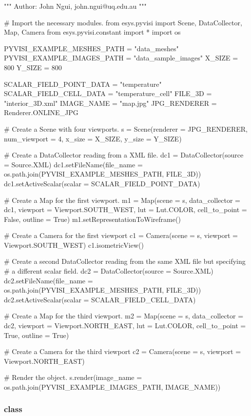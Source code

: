 \begin{python}
"""
Author: John Ngui, john.ngui@uq.edu.au
"""

# Import the necessary modules.
from esys.pyvisi import Scene, DataCollector, Map, Camera
from esys.pyvisi.constant import *
import os

PYVISI_EXAMPLE_MESHES_PATH = "data_meshes"
PYVISI_EXAMPLE_IMAGES_PATH = "data_sample_images"
X_SIZE = 800
Y_SIZE = 800

SCALAR_FIELD_POINT_DATA = "temperature"
SCALAR_FIELD_CELL_DATA = "temperature_cell"
FILE_3D = "interior_3D.xml"
IMAGE_NAME = "map.jpg"
JPG_RENDERER = Renderer.ONLINE_JPG

# Create a Scene with four viewports.
s = Scene(renderer = JPG_RENDERER, num_viewport = 4, x_size = X_SIZE, 
        y_size = Y_SIZE)

# Create a DataCollector reading from a XML file.
dc1 = DataCollector(source = Source.XML)
dc1.setFileName(file_name = os.path.join(PYVISI_EXAMPLE_MESHES_PATH, FILE_3D))
dc1.setActiveScalar(scalar = SCALAR_FIELD_POINT_DATA)

# Create a  Map for the first viewport.
m1 = Map(scene = s, data_collector = dc1, viewport = Viewport.SOUTH_WEST, 
        lut = Lut.COLOR, cell_to_point = False, outline = True)
m1.setRepresentationToWireframe()

# Create a Camera for the first viewport
c1 = Camera(scene = s, viewport = Viewport.SOUTH_WEST)
c1.isometricView()

# Create a second DataCollector reading from the same XML file but specifying
# a different scalar field.
dc2 = DataCollector(source = Source.XML)
dc2.setFileName(file_name = os.path.join(PYVISI_EXAMPLE_MESHES_PATH, FILE_3D))
dc2.setActiveScalar(scalar = SCALAR_FIELD_CELL_DATA)

# Create a Map for the third viewport.
m2 = Map(scene = s, data_collector = dc2, viewport = Viewport.NORTH_EAST, 
        lut = Lut.COLOR, cell_to_point = True, outline = True)

# Create a Camera for the third viewport
c2 = Camera(scene = s, viewport = Viewport.NORTH_EAST)

# Render the object.
s.render(image_name = os.path.join(PYVISI_EXAMPLE_IMAGES_PATH, IMAGE_NAME))
\end{python}

\subsubsection{\MapOnPlaneCut class}

